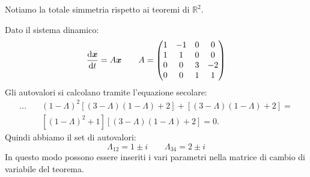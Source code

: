 \noindent
Notiamo la totale simmetria rispetto ai teoremi di $\mathbb{R}^2$.
\begin{exmp}[]
    Dato il sistema dinamico:
    \[
	\frac{\text{d} \boldsymbol{x}}{\text{d} t} = A \boldsymbol{x}  \qquad 
	A = 
	\begin{pmatrix} 
	    1 & - 1 & 0 & 0 \\
	    1 & 1 & 0 & 0 \\
	    0 & 0 & 3 & -2 \\
	    0 & 0 & 1 & 1
        \end{pmatrix} 
    \] 
    Gli autovalori si calcolano tramite l'equazione secolare:
    \[\begin{aligned}
	\ldots \quad &(1-\Lambda)^2\left[(3-\Lambda)(1-\Lambda)+2\right]+\left[(3-\Lambda)(1-\Lambda)+2\right] = \\
		     &\left[(1-\Lambda)^2 + 1\right]\left[(3-\Lambda)(1-\Lambda) +2\right]= 0
    .\end{aligned}\]
    Quindi abbiamo il set di autovalori:
    \[
        \Lambda_{12} = 1 \pm i \qquad \Lambda_{34} = 2\pm i
    \] 
    In questo modo possono essere inseriti i vari parametri nella matrice di cambio di variabile del teorema.
\end{exmp}
\noindent
